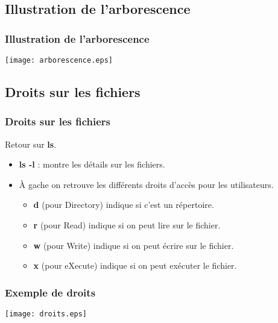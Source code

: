 \documentclass{beamer}
\begin{document}
    \subsection{Illustration de l'arborescence}
    \begin{frame}
        \frametitle{Illustration de l'arborescence}
        \texttt{[image: arborescence.eps]}
    \end{frame}

    \subsection{Droits sur les fichiers}
    \begin{frame}
        \frametitle{Droits sur les fichiers}
        Retour sur {\bf ls}.
        \begin{itemize}
            \item {\bf ls -l} : montre les détails sur les fichiers.
            \item À gache on retrouve les différents droits d'accès pour les utilisateurs.
                \begin{itemize}
                    \item {\bf d} (pour Directory) indique si c'est un répertoire.
                    \item {\bf r} (pour Read) indique si on peut lire sur le fichier.
                    \item {\bf w} (pour Write) indique si on peut écrire sur le fichier.
                    \item {\bf x} (pour eXecute) indique si on peut exécuter le fichier.
                \end{itemize}
        \end{itemize}
    \end{frame}

    \begin{frame}
        \frametitle{Exemple de droits}
        \texttt{[image: droits.eps]}
    \end{frame}
\end{document}
